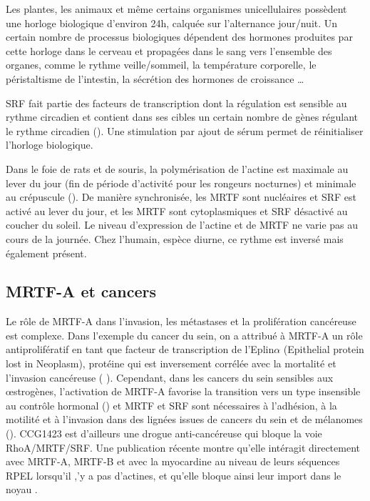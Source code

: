 Les plantes, les animaux et même certains organismes unicellulaires possèdent une horloge biologique d'environ 24h, calquée sur l'alternance jour/nuit. Un certain nombre de processus biologiques dépendent des hormones produites par cette horloge dans le cerveau et propagées dans le sang vers l'ensemble des organes, comme le rythme veille/sommeil, la température corporelle, le péristaltisme de l'intestin, la sécrétion des hormones de croissance \dots 

SRF fait partie des facteurs de transcription dont la régulation est sensible au rythme circadien et contient dans ses cibles un certain nombre de gènes régulant le rythme circadien (\cite{esnault_rho-actin_2014}). Une stimulation par ajout de sérum permet de réinitialiser l'horloge biologique.

Dans le foie de rats et de souris, la polymérisation de l'actine est maximale au lever du jour (fin de période d'activité pour les rongeurs nocturnes) et minimale au crépuscule (\cite{gerber_blood-borne_2013}). De manière synchronisée, les MRTF sont nucléaires et SRF est activé au lever du jour, et les MRTF sont cytoplasmiques et SRF désactivé au coucher du soleil. Le niveau d'expression de l'actine et de MRTF ne varie pas au cours de la journée. Chez l'humain, espèce diurne, ce rythme est inversé mais également présent. 



\subsection{MRTF-A et cancers}
Le rôle de MRTF-A dans l'invasion, les métastases et la prolifération cancéreuse est complexe. 
Dans l'exemple du cancer du sein, on a attribué à MRTF-A un rôle antiprolifératif en tant que facteur de transcription de l'Eplin$\alpha$ (Epithelial protein lost in Neoplasm), protéine qui est inversement corrélée avec la mortalité et l'invasion cancéreuse ( \cite{leitner_epithelial_2010}).
Cependant, dans les cancers du sein sensibles aux \oe strogènes, l'activation de MRTF-A favorise la transition vers un type insensible au contrôle hormonal (\cite{kerdivel_activation_2014}) et MRTF et SRF sont nécessaires à l'adhésion, à la motilité et à l'invasion dans des lignées issues de cancers du sein et de mélanomes (\cite{medjkane_myocardin-related_2009}). CCG1423 est d'ailleurs une drogue anti-cancéreuse qui bloque la voie RhoA/MRTF/SRF. Une publication récente montre qu'elle intéragit directement avec MRTF-A, MRTF-B et avec la myocardine au niveau de leurs séquences RPEL lorsqu'il ,'y a pas d'actines, et qu'elle bloque ainsi leur import dans le noyau \cite{hayashi_2014}. 
 

